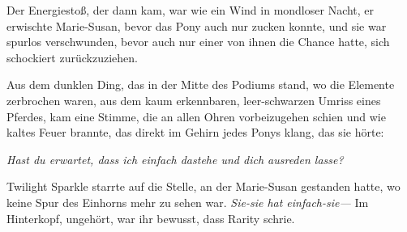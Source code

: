 Der Energiestoß, der dann kam, war wie ein Wind in mondloser Nacht, er erwischte Marie-Susan, bevor das Pony auch nur zucken konnte, und sie war spurlos verschwunden, bevor auch nur einer von ihnen die Chance hatte, sich schockiert zurückzuziehen.

Aus dem dunklen Ding, das in der Mitte des Podiums stand, wo die Elemente zerbrochen waren, aus dem kaum erkennbaren, leer-schwarzen Umriss eines Pferdes, kam eine Stimme, die an allen Ohren vorbeizugehen schien und wie kaltes Feuer brannte, das direkt im Gehirn jedes Ponys klang, das sie hörte:

\emph{Hast du erwartet, dass ich einfach dastehe und dich ausreden lasse?}

Twilight Sparkle starrte auf die Stelle, an der Marie-Susan gestanden hatte, wo keine Spur des Einhorns mehr zu sehen war. \emph{Sie-sie hat einfach-sie—} Im Hinterkopf, ungehört, war ihr bewusst, dass Rarity schrie.

